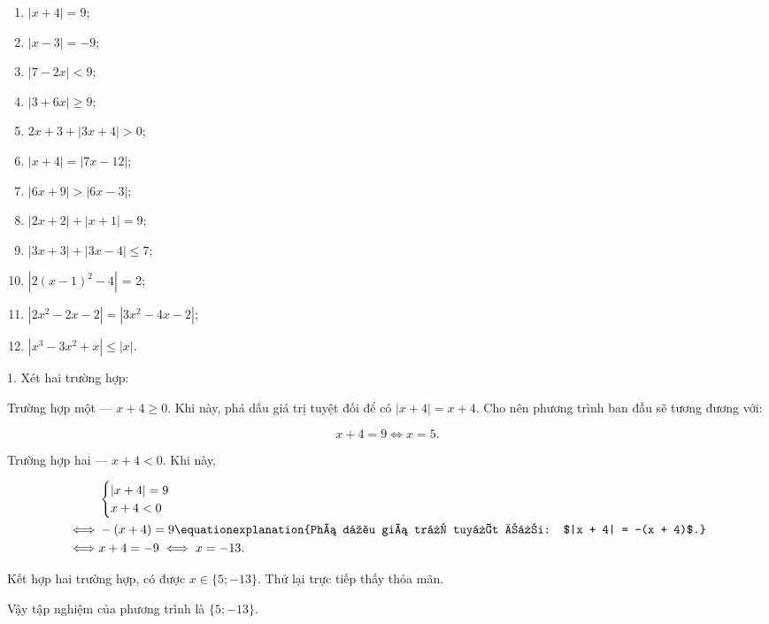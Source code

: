 \begin{multicols}{2}
   \begin{enumerate}
      \item $|x + 4| = 9$;
      \item $|x - 3| = -9$;
      \item $|7 - 2x| < 9$;
      \item $|3 + 6x| \geq 9$;
      \item $2x + 3 + |3x + 4| > 0$;
      \item $|x + 4| = |7x - 12|$;
      \item $|6x + 9| > |6x - 3|$;
      \item $\left|2x + 2\right| + |x + 1| = 9$;
      \item $|3x + 3| + |3x - 4| \leq 7$;
      \item $\left|2(x - 1)^2 - 4\right|$ = 2;
      \item $\left|2x^2 - 2x - 2\right| = \left|3x^2 - 4x - 2\right|$;
      \item $\left|x^3 - 3x^2 + x\right| \leq |x|$.
   \end{enumerate}
\end{multicols}

\solution

1. Xét hai trường hợp:

\textcolor{colorEmphasisCyan}{Trường hợp một --- $x + 4 \geq 0$}. Khi này, phá dấu giá trị tuyệt đối để có $|x + 4| = x + 4$. Cho nên phương trình ban đầu sẽ tương đương với:

\begin{equation*}
   x + 4 = 9 \iff x = 5.
\end{equation*}

\textcolor{colorEmphasis}{Trường hợp hai --- $x + 4 < 0$}. Khi này,

\begin{align*}
   &\begin{cases}
      |x + 4| = 9 \\
      x + 4 < 0
   \end{cases} \\
   \iff &-(x + 4) = 9 \equationexplanation{Phá dấu giá trị tuyệt đối: $|x + 4| = -(x + 4)$.}\\
   \iff &x + 4 = -9 \iff x = -13.
\end{align*}

Kết hợp hai trường hợp, có được $x \in \{5; -13\}$. Thử lại trực tiếp thấy thỏa mãn.

Vậy tập nghiệm của phương trình là $\{5; -13\}$.

